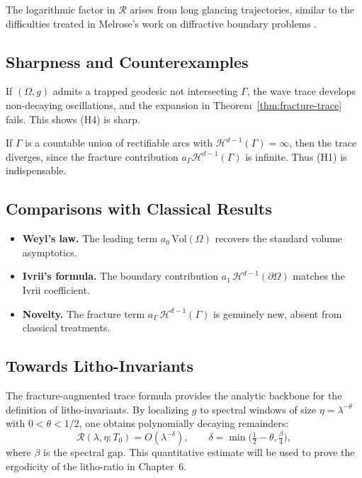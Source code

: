 The logarithmic factor in $\mathcal{R}$ arises from long glancing
trajectories, similar to the difficulties treated in Melrose’s work on
diffractive boundary problems \cite{Melrose1995}.

\subsection{Sharpness and Counterexamples}
\begin{example}
If $(\Omega,g)$ admits a trapped geodesic not intersecting $\Gamma$, the
wave trace develops non-decaying oscillations, and the expansion in
Theorem~\ref{thm:fracture-trace} fails. This shows (H4) is sharp.
\end{example}

\begin{example}
If $\Gamma$ is a countable union of rectifiable arcs with
$\mathcal{H}^{d-1}(\Gamma)=\infty$, then the trace diverges, since the
fracture contribution $a_\Gamma \mathcal{H}^{d-1}(\Gamma)$ is infinite.
Thus (H1) is indispensable.
\end{example}

\subsection{Comparisons with Classical Results}
\begin{itemize}
\item \textbf{Weyl’s law.} The leading term
$a_0\,\mathrm{Vol}(\Omega)$ recovers the standard volume asymptotics.
\item \textbf{Ivrii’s formula.} The boundary contribution
$a_1\,\mathcal{H}^{d-1}(\partial\Omega)$ matches the Ivrii coefficient.
\item \textbf{Novelty.} The fracture term
$a_\Gamma\,\mathcal{H}^{d-1}(\Gamma)$ is genuinely new, absent from
classical treatments.
\end{itemize}

\subsection{Towards Litho-Invariants}
The fracture-augmented trace formula provides the analytic backbone for the
definition of litho-invariants. By localizing $g$ to spectral windows of
size $\eta=\lambda^{-\theta}$ with $0<\theta<1/2$, one obtains polynomially
decaying remainders:
\[
\mathcal{R}(\lambda,\eta;T_0) = O(\lambda^{-\delta}), \qquad
\delta = \min\Big(\tfrac{1}{2}-\theta,\tfrac{\beta}{4}\Big),
\]
where $\beta$ is the spectral gap. This quantitative estimate will be used
to prove the ergodicity of the litho-ratio in Chapter~6.

